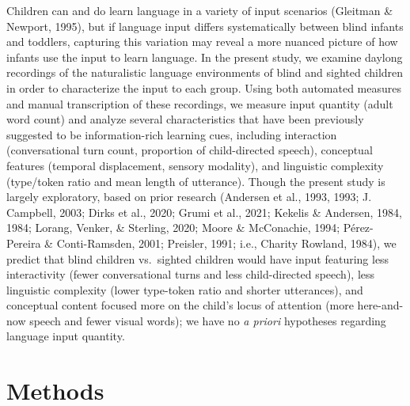\documentclass[
  man]{apa6}
\begin{document}
Children can and do learn language in a variety of input scenarios (Gleitman \& Newport, 1995), but if language input differs systematically between blind infants and toddlers, capturing this variation may reveal a more nuanced picture of how infants use the input to learn language. In the present study, we examine daylong recordings of the naturalistic language environments of blind and sighted children in order to characterize the input to each group. Using both automated measures and manual transcription of these recordings, we measure input quantity (adult word count) and analyze several characteristics that have been previously suggested to be information-rich learning cues, including interaction (conversational turn count, proportion of child-directed speech), conceptual features (temporal displacement, sensory modality), and linguistic complexity (type/token ratio and mean length of utterance). Though the present study is largely exploratory, based on prior research (Andersen et al., 1993, 1993; J. Campbell, 2003; Dirks et al., 2020; Grumi et al., 2021; Kekelis \& Andersen, 1984, 1984; Lorang, Venker, \& Sterling, 2020; Moore \& McConachie, 1994; Pérez-Pereira \& Conti-Ramsden, 2001; Preisler, 1991; i.e., Charity Rowland, 1984), we predict that blind children vs.~sighted children would have input featuring less interactivity (fewer conversational turns and less child-directed speech), less linguistic complexity (lower type-token ratio and shorter utterances), and conceptual content focused more on the child's locus of attention (more here-and-now speech and fewer visual words); we have no \emph{a priori} hypotheses regarding language input quantity.

\hypertarget{methods}{%
\section{Methods}\label{methods}}
\end{document}

